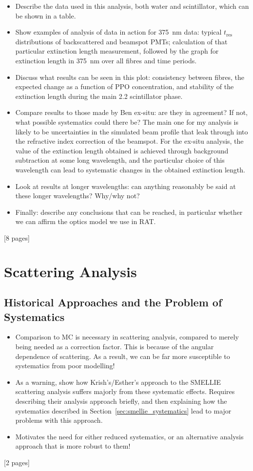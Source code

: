 {
\color{blue}
\begin{itemize}
    \item Describe the data used in this analysis, both water and scintillator, which can be shown in a table.
    \item Show examples of analysis of data in action for \SI{375}{\nm} data: typical $t_{\textrm{res}}$ distributions of backscattered and beamspot PMTs; calculation of that particular extinction length measurement, followed by the graph for extinction length in \SI{375}{\nm} over all fibres and time periods.
    \item Discuss what results can be seen in this plot: consistency between fibres, the expected change as a function of PPO concentration, and stability of the extinction length during the main \SI{2.2}{\gpl} scintillator phase.
    \item Compare results to those made by Ben ex-situ: are they in agreement? If not, what possible systematics could there be? The main one for my analysis is likely to be uncertainties in the simulated beam profile that leak through into the refractive index correction of the beamspot. For the ex-situ analysis, the value of the extinction length obtained is achieved through background subtraction at some long wavelength, and the particular choice of this wavelength can lead to systematic changes in the obtained extinction length.
    \item Look at results at longer wavelengths: can anything reasonably be said at these longer wavelengths? Why/why not?
    \item Finally: describe any conclusions that can be reached, in particular whether we can affirm the optics model we use in RAT.
\end{itemize}
[8 pages]

\section{Scattering Analysis}\label{sec:scattering_analysis}
\subsection{Historical Approaches and the Problem of Systematics}
\begin{itemize}
    \item Comparison to MC is necessary in scattering analysis, compared to merely being needed as a correction factor. This is because of the angular dependence of scattering. As a result, we can be far more susceptible to systematics from poor modelling!
    \item As a warning, show how Krish's/Esther's approach to the SMELLIE scattering analysis suffers majorly from these systematic effects. Requires describing their analysis approach briefly, and then explaining how the systematics described in Section~\ref{sec:smellie_systematics} lead to major problems with this approach.
    \item Motivates the need for either reduced systematics, or an alternative analysis approach that is more robust to them!
\end{itemize}
[2 pages]
}
